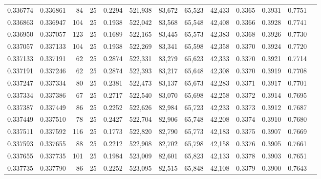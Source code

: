\begin{tabular}{rrrrrrrrrrrrr}
0.336774 & 0.336861 &    84 &  25 &                                     0.2294 & 521,938 &  83,672 &  65,523 &  42,433 & 0.3365 & 0.3931 & 0.7751 \\
0.336863 & 0.336947 &   104 &  25 &                                     0.1938 & 522,042 &  83,568 &  65,548 &  42,408 & 0.3366 & 0.3928 & 0.7741 \\
0.336950 & 0.337057 &   123 &  25 &                                     0.1689 & 522,165 &  83,445 &  65,573 &  42,383 & 0.3368 & 0.3926 & 0.7730 \\
0.337057 & 0.337133 &   104 &  25 &                                     0.1938 & 522,269 &  83,341 &  65,598 &  42,358 & 0.3370 & 0.3924 & 0.7720 \\
0.337133 & 0.337191 &    62 &  25 &                                     0.2874 & 522,331 &  83,279 &  65,623 &  42,333 & 0.3370 & 0.3921 & 0.7714 \\
0.337191 & 0.337246 &    62 &  25 &                                     0.2874 & 522,393 &  83,217 &  65,648 &  42,308 & 0.3370 & 0.3919 & 0.7708 \\
0.337247 & 0.337334 &    80 &  25 &                                     0.2381 & 522,473 &  83,137 &  65,673 &  42,283 & 0.3371 & 0.3917 & 0.7701 \\
0.337334 & 0.337386 &    67 &  25 &                                     0.2717 & 522,540 &  83,070 &  65,698 &  42,258 & 0.3372 & 0.3914 & 0.7695 \\
0.337387 & 0.337449 &    86 &  25 &                                     0.2252 & 522,626 &  82,984 &  65,723 &  42,233 & 0.3373 & 0.3912 & 0.7687 \\
0.337449 & 0.337510 &    78 &  25 &                                     0.2427 & 522,704 &  82,906 &  65,748 &  42,208 & 0.3374 & 0.3910 & 0.7680 \\
0.337511 & 0.337592 &   116 &  25 &                                     0.1773 & 522,820 &  82,790 &  65,773 &  42,183 & 0.3375 & 0.3907 & 0.7669 \\
0.337593 & 0.337655 &    88 &  25 &                                     0.2212 & 522,908 &  82,702 &  65,798 &  42,158 & 0.3376 & 0.3905 & 0.7661 \\
0.337655 & 0.337735 &   101 &  25 &                                     0.1984 & 523,009 &  82,601 &  65,823 &  42,133 & 0.3378 & 0.3903 & 0.7651 \\
0.337735 & 0.337790 &    86 &  25 &                                     0.2252 & 523,095 &  82,515 &  65,848 &  42,108 & 0.3379 & 0.3900 & 0.7643 \\

\end{tabular}
